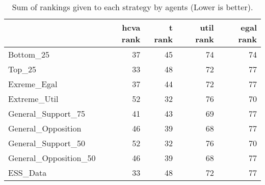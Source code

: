 \begin{table}
\caption{Sum of rankings given to each strategy by agents (Lower is better).}
\begin{tabular}{lrrrr}
\toprule
 & hcva rank & t rank & util rank & egal rank \\
\midrule
Bottom_25 & 37 & 45 & 74 & 74 \\
Top_25 & 33 & 48 & 72 & 77 \\
Exreme_Egal & 37 & 44 & 72 & 77 \\
Extreme_Util & 52 & 32 & 76 & 70 \\
General_Support_75 & 41 & 43 & 69 & 77 \\
General_Opposition & 46 & 39 & 68 & 77 \\
General_Support_50 & 52 & 32 & 76 & 70 \\
General_Opposition_50 & 46 & 39 & 68 & 77 \\
ESS_Data & 33 & 48 & 72 & 77 \\
\bottomrule
\end{tabular}
\end{table}
